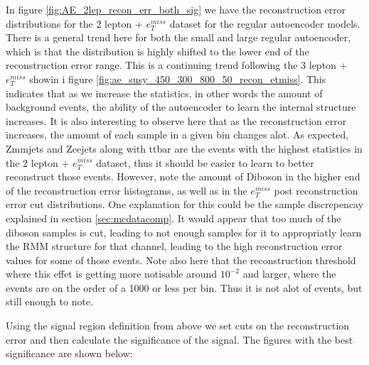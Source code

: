 In figure \ref{fig:AE_2lep_recon_err_both_sig} we have the reconstruction error distributions for the 2 lepton + $e_T^{miss}$ 
dataset for the regular autoencoder models. There is a general trend here for both the small and large regular autoencoder, which is that 
the distribution is highly shifted to the lower end of the reconstruction error range. This is a continuing trend following the 3 lepton + $e_T^{miss}$
showin i figure \ref{fig:ae_susy_450_300_800_50_recon_etmiss}. This indicates that as we increase the statistics, in other words the amount of 
background events, the ability of the autoencoder to learn the internal structure increases. It is also interesting to observe here that 
as the reconstruction error increases, the amount of each sample in a given bin changes alot. As expected, Zmmjets and Zeejets along with 
ttbar are the events with the highest statistics in the 2 lepton + $e_T^{miss}$ dataset, thus it should be easier to learn to better 
reconstruct those events. However, note the amount of Diboson in the higher end of the reconstruction error histograms, as well as in 
the $e_T^{miss}$ post reconstruction error cut distributions. One explanation for this could be the sample discrepencay explained in section
 \ref{sec:mcdatacomp}. It would appear that too much of the diboson samples is cut, leading to not enough samples for it to appropriatly 
 learn the RMM structure for that channel, leading to the high reconstruction error values for some of those events. Note also here that
  the reconstruction threshold where this effet is getting more notisable around $10^{-2}$ and larger, where the events are on the order of 
  a 1000 or less per bin. Thus it is not alot of events, but still enough to note. \par 
Using the signal region definition from above we set cuts on the reconstruction error and then calculate the significance of the signal. 
The figures with the best significance are shown below:

